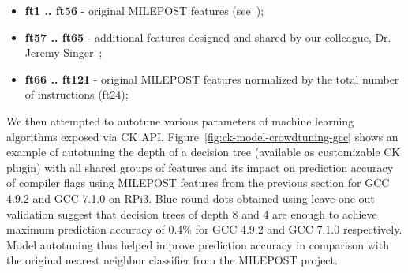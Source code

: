 \begin{itemize}
  \item {\bf ft1 .. ft56} - original MILEPOST features (see~\cite{29db2248aba45e59:a31e374796869125});
  \item {\bf ft57 .. ft65} - additional features designed and shared by our colleague, Dr. Jeremy Singer~\cite{all-milepost-features};
  \item {\bf ft66 .. ft121} - original MILEPOST features normalized by the total number of instructions (ft24);
\end{itemize}

We then attempted to autotune various parameters
of machine learning algorithms exposed via CK API.
%
Figure~\ref{fig:ck-model-crowdtuning-gcc}
shows an example of autotuning the depth of a decision tree
(available as customizable CK plugin) with all shared groups of features
and its impact on prediction accuracy of compiler flags using MILEPOST
features from the previous section for GCC 4.9.2 and GCC 7.1.0
on RPi3.
%
Blue round dots obtained using leave-one-out validation suggest 
that decision trees of depth 8 and 4 are enough 
to achieve maximum prediction accuracy of 0.4\% for GCC 4.9.2 
and GCC 7.1.0 respectively.
%
Model autotuning thus helped improve prediction accuracy in comparison 
with the original nearest neighbor classifier from the MILEPOST project. 

